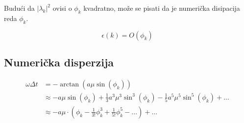 \documentclass{article}
\begin{document}
Budući da $|\lambda_k|^2$ ovisi o $\phi_k$ kvadratno, može se pisati da je
numerička disipacija reda $\phi_k$.

\begin{equation}
    \epsilon(k) = O(\phi_k)
\end{equation}

\subsection{Numerička disperzija}

\begin{align*}
    \omega \Delta t &= -\arctan{(a \mu \sin(\phi_k))} \\
    &\approx -a \mu \sin(\phi_k)
        + \frac{1}{3} a^3 \mu^3 \sin^3(\phi_k)
        - \frac{1}{5} a^5 \mu^5 \sin^5(\phi_k) + ... \\
    &\approx -a \mu \cdot
        \left( \phi_k - \frac{1}{3!}\phi_k^3 + \frac{1}{5!}\phi_k^5 -...\right)
        + ...
\end{align*}
\end{document}
